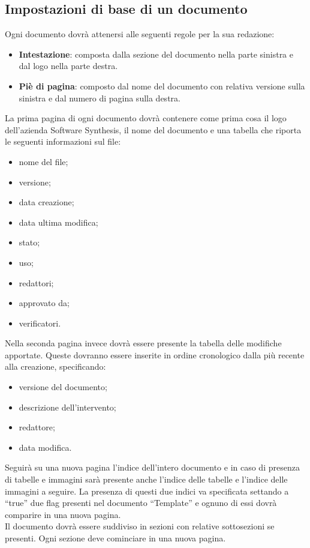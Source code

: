 \subsection{Impostazioni di base di un documento}
Ogni documento dovrà attenersi alle seguenti regole per la sua redazione:
\begin{itemize}
\item \textbf{Intestazione}: composta dalla sezione del documento nella parte sinistra e dal logo nella parte destra.
\item \textbf{Piè di pagina}: composto dal nome del documento con relativa versione sulla sinistra  e dal numero di pagina sulla destra.
\end{itemize}
La prima pagina di ogni documento dovrà contenere come prima cosa il logo dell'azienda Software Synthesis, il nome del documento e una tabella che riporta le seguenti informazioni sul file:
\begin{itemize}
\item nome del file;
\item versione;
\item data creazione;
\item data ultima modifica;
\item stato;
\item uso;
\item redattori;
\item approvato da;
\item verificatori.
\end{itemize}

Nella seconda pagina invece dovrà essere presente la tabella delle modifiche apportate. Queste dovranno essere inserite in ordine cronologico dalla più recente alla creazione, specificando:
\begin{itemize}
\item versione del documento;
\item descrizione dell'intervento;
\item redattore;
\item data modifica.
\end{itemize}
Seguirà su una nuova pagina l'indice dell'intero documento e in caso di presenza di tabelle e immagini sarà presente anche l'indice delle tabelle e l'indice delle immagini a seguire. La presenza di questi due indici va specificata settando a ``true'' due flag presenti nel documento ``Template'' e ognuno di essi dovrà comparire in una nuova pagina.\\
Il documento dovrà essere suddiviso in sezioni con relative sottosezioni se presenti. Ogni sezione deve cominciare in una nuova pagina.

